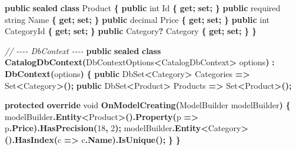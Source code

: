 \documentclass[
  italian,
  10pt,
]{book}
\newenvironment{Shaded}{\begin{snugshade}}{\end{snugshade}}
\newcommand{\CommentTok}[1]{\textcolor[rgb]{0.56,0.35,0.01}{\textit{#1}}}
\newcommand{\DataTypeTok}[1]{\textcolor[rgb]{0.13,0.29,0.53}{#1}}
\newcommand{\DecValTok}[1]{\textcolor[rgb]{0.00,0.00,0.81}{#1}}
\newcommand{\FunctionTok}[1]{\textcolor[rgb]{0.13,0.29,0.53}{\textbf{#1}}}
\newcommand{\KeywordTok}[1]{\textcolor[rgb]{0.13,0.29,0.53}{\textbf{#1}}}
\newcommand{\NormalTok}[1]{#1}
\newcommand{\OperatorTok}[1]{\textcolor[rgb]{0.81,0.36,0.00}{\textbf{#1}}}
\begin{document}
\begin{Shaded}
\begin{Highlighting}[]
\KeywordTok{public} \KeywordTok{sealed} \KeywordTok{class}\NormalTok{ Product}
\OperatorTok{\{}
    \KeywordTok{public} \DataTypeTok{int}\NormalTok{ Id }\OperatorTok{\{} \KeywordTok{get}\OperatorTok{;} \KeywordTok{set}\OperatorTok{;} \OperatorTok{\}}
    \KeywordTok{public}\NormalTok{ required }\DataTypeTok{string}\NormalTok{ Name }\OperatorTok{\{} \KeywordTok{get}\OperatorTok{;} \KeywordTok{set}\OperatorTok{;} \OperatorTok{\}}
    \KeywordTok{public} \DataTypeTok{decimal}\NormalTok{ Price }\OperatorTok{\{} \KeywordTok{get}\OperatorTok{;} \KeywordTok{set}\OperatorTok{;} \OperatorTok{\}}
    \KeywordTok{public} \DataTypeTok{int}\NormalTok{ CategoryId }\OperatorTok{\{} \KeywordTok{get}\OperatorTok{;} \KeywordTok{set}\OperatorTok{;} \OperatorTok{\}}
    \KeywordTok{public}\NormalTok{ Category}\OperatorTok{?}\NormalTok{ Category }\OperatorTok{\{} \KeywordTok{get}\OperatorTok{;} \KeywordTok{set}\OperatorTok{;} \OperatorTok{\}}
\OperatorTok{\}}

\CommentTok{// {-}{-}{-}{-} DbContext {-}{-}{-}{-}}
\KeywordTok{public} \KeywordTok{sealed} \KeywordTok{class} \FunctionTok{CatalogDbContext}\OperatorTok{(}\NormalTok{DbContextOptions}\OperatorTok{\textless{}}\NormalTok{CatalogDbContext}\OperatorTok{\textgreater{}}\NormalTok{ options}\OperatorTok{)}
    \OperatorTok{:} \FunctionTok{DbContext}\OperatorTok{(}\NormalTok{options}\OperatorTok{)}
\OperatorTok{\{}
    \KeywordTok{public}\NormalTok{ DbSet}\OperatorTok{\textless{}}\NormalTok{Category}\OperatorTok{\textgreater{}}\NormalTok{ Categories }\OperatorTok{=\textgreater{}}\NormalTok{ Set}\OperatorTok{\textless{}}\NormalTok{Category}\OperatorTok{\textgreater{}();}
    \KeywordTok{public}\NormalTok{ DbSet}\OperatorTok{\textless{}}\NormalTok{Product}\OperatorTok{\textgreater{}}\NormalTok{ Products }\OperatorTok{=\textgreater{}}\NormalTok{ Set}\OperatorTok{\textless{}}\NormalTok{Product}\OperatorTok{\textgreater{}();}

    \KeywordTok{protected} \KeywordTok{override} \DataTypeTok{void} \FunctionTok{OnModelCreating}\OperatorTok{(}\NormalTok{ModelBuilder modelBuilder}\OperatorTok{)}
    \OperatorTok{\{}
\NormalTok{        modelBuilder}\OperatorTok{.}\FunctionTok{Entity}\OperatorTok{\textless{}}\NormalTok{Product}\OperatorTok{\textgreater{}().}\FunctionTok{Property}\OperatorTok{(}\NormalTok{p }\OperatorTok{=\textgreater{}}\NormalTok{ p}\OperatorTok{.}\FunctionTok{Price}\OperatorTok{).}\FunctionTok{HasPrecision}\OperatorTok{(}\DecValTok{18}\OperatorTok{,} \DecValTok{2}\OperatorTok{);}
\NormalTok{        modelBuilder}\OperatorTok{.}\FunctionTok{Entity}\OperatorTok{\textless{}}\NormalTok{Category}\OperatorTok{\textgreater{}().}\FunctionTok{HasIndex}\OperatorTok{(}\NormalTok{c }\OperatorTok{=\textgreater{}}\NormalTok{ c}\OperatorTok{.}\FunctionTok{Name}\OperatorTok{).}\FunctionTok{IsUnique}\OperatorTok{();}
    \OperatorTok{\}}
\OperatorTok{\}}


\end{Highlighting}
\end{Shaded}
\end{document}
